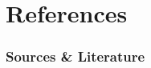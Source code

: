 \documentclass{beamer}
\begin{document}


\section[Sources]{References}
\begin{frame} \frametitle{Sources \& Literature}
\nocite{buckel}
\nocite{tinkham}
\nocite{BCS}
\nocite{GL}
\nocite{hofmann}


\end{frame}
\end{document}
